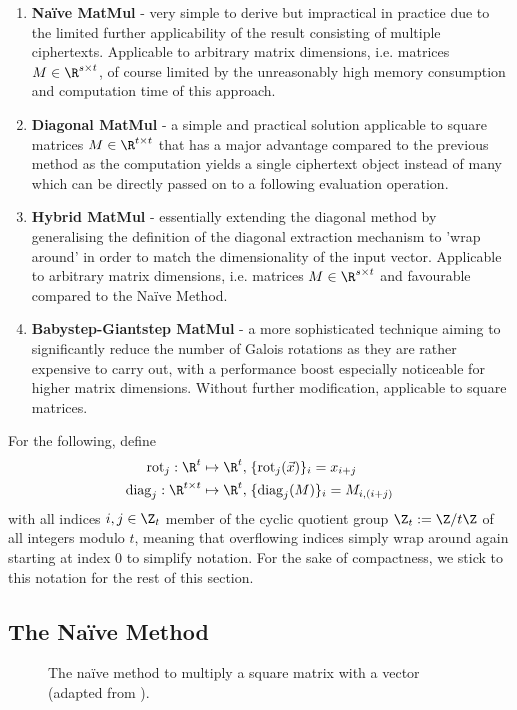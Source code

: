 \begin{enumerate}
  \item \textbf{Naïve MatMul} - very simple to derive but impractical in practice due to the limited further applicability of the result consisting of multiple ciphertexts. Applicable to arbitrary matrix dimensions, i.e. matrices $M \in \R^{s \times t}$, of course limited by the unreasonably high memory consumption and computation time of this approach.
  \item \textbf{Diagonal MatMul} - a simple and practical solution applicable to square matrices $M \in \R^{t \times t}$ that has a major advantage compared to the previous method as the computation yields a single ciphertext object instead of many which can be directly passed on to a following evaluation operation.
  \item \textbf{Hybrid MatMul} - essentially extending the diagonal method by generalising the definition of the diagonal extraction mechanism to 'wrap around' in order to match the dimensionality of the input vector.
        Applicable to arbitrary matrix dimensions, i.e. matrices $M \in \R^{s \times t}$ and favourable compared to the Naïve Method.
  \item \textbf{Babystep-Giantstep MatMul} - a more sophisticated technique aiming to significantly reduce the number of Galois rotations as they are rather expensive to carry out, with a performance boost especially noticeable for higher matrix dimensions.
        Without further modification, applicable to square matrices.
\end{enumerate}

For the following, define
\newcommand{\rot}{\mathrm{rot}}
\newcommand{\diag}{\mathrm{diag}}
\begin{align}
  \rot_j: \R^t \mapsto \R^t,             & \; \{\rot_j(\vec{x})\}_i = x_{i + j} \label{eq:rot-definition} \\
  \diag_j: \R^{t \times t} \mapsto \R^t, & \; \{\diag_j(M)\}_i = M_{i, (i+j)} \label{eq:diag-definition}
\end{align}
with all indices $i, j \in \Z_t$ member of the cyclic quotient group $\Z_t := \Z / t \Z$ of all integers modulo $t$, meaning that overflowing indices simply wrap around again starting at index $0$ to simplify notation.
For the sake of compactness, we stick to this notation for the rest of this section.

\pagebreak
\subsection{The Naïve Method}
\begin{figure}[H]
  \centering
  \caption[Naïve matrix multiplication method]{The naïve method to multiply a square matrix with a vector (adapted from \cite{2018-gazelle}).}
\end{figure}

